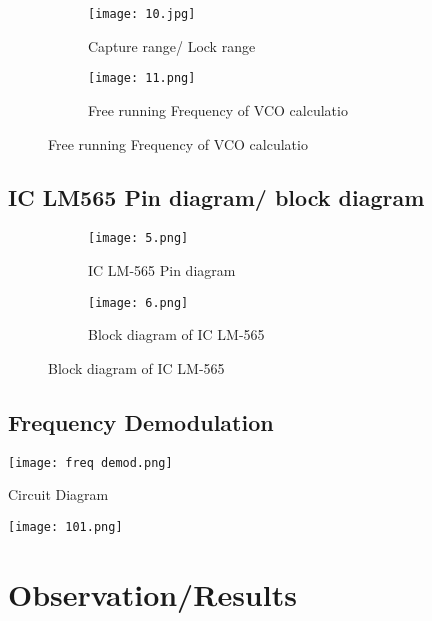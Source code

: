 \documentclass{article}
\begin{document}
\begin{figure}[h]
  \begin{subfigure}[b]{0.5\textwidth}
    \texttt{[image: 10.jpg]}
    \caption{Capture range/ Lock range}
    \label{fig:1}
  \end{subfigure}
  \begin{subfigure}[b]{0.4\textwidth}
    \texttt{[image: 11.png]}
    \caption{Free running Frequency of VCO calculatio}
    \label{fig:2}
  \end{subfigure}
\end{figure}

\subsection{IC LM565 Pin diagram/ block diagram}


\begin{figure}[h]
  \begin{subfigure}[b]{0.5\textwidth}
    \texttt{[image: 5.png]}
    \caption{ IC LM-565 Pin diagram}
    \label{fig:1}
  \end{subfigure}
  \begin{subfigure}[b]{0.4\textwidth}
    \texttt{[image: 6.png]}
    \caption{Block diagram of IC LM-565}
    \label{fig:2}
  \end{subfigure}
\end{figure}
\subsection{Frequency Demodulation}

\begin{figure*}[h]
	\centering
	\texttt{[image: freq demod.png]}
	\caption{Frequency Demodulation}
	\label{FBD}
\end{figure*}
Circuit Diagram
\begin{figure*}[ht]
	\centering
	\texttt{[image: 101.png]}
	\caption{Circuit diagram of  demodulation}
	\label{FBD}
\end{figure*}















\section{Observation/Results}
\end{document}
